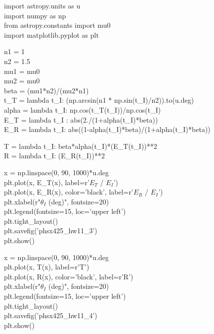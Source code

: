 \documentclass[12pt]{article}
\begin{document}
\noindent
import astropy.units as u\\
import numpy as np\\
from astropy.constants import mu0\\
import matplotlib.pyplot as plt\bigskip

\noindent
n1 = 1\\
n2 = 1.5\\
mu1 = mu0\\
mu2 = mu0\\
beta = (mu1*n2)/(mu2*n1)\\
t\_T = lambda t\_I: (np.arcsin(n1 * np.sin(t\_I)/n2)).to(u.deg)\\
alpha = lambda t\_I: np.cos(t\_T(t\_I))/np.cos(t\_I)\\
E\_T = lambda t\_I : abs(2./(1+alpha(t\_I)*beta))\\
E\_R = lambda t\_I: abs((1-alpha(t\_I)*beta)/(1+alpha(t\_I)*beta))\bigskip

\noindent
T = lambda t\_I: beta*alpha(t\_I)*(E\_T(t\_I))**2\\
R = lambda t\_I: (E\_R(t\_I))**2\bigskip

\noindent
x = np.linspace(0, 90, 1000)*u.deg\\
plt.plot(x, E\_T(x), label=r'$E_T$ / $E_I$')\\
plt.plot(x, E\_R(x), color='black', label=r'$E_R$ / $E_I$')\\
plt.xlabel(r"$\theta_I$ (deg)", fontsize=20)\\
plt.legend(fontsize=15, loc='upper left')\\
plt.tight\_layout()\\
plt.savefig('phsx425\_hw11\_3')\\
plt.show()\bigskip

\noindent
x = np.linspace(0, 90, 1000)*u.deg\\
plt.plot(x, T(x), label=r'T')\\
plt.plot(x, R(x), color='black', label=r'R')\\
plt.xlabel(r"$\theta_I$ (deg)", fontsize=20)\\
plt.legend(fontsize=15, loc='upper left')\\
plt.tight\_layout()\\
plt.savefig('phsx425\_hw11\_4')\\
plt.show()\\
\end{document}
